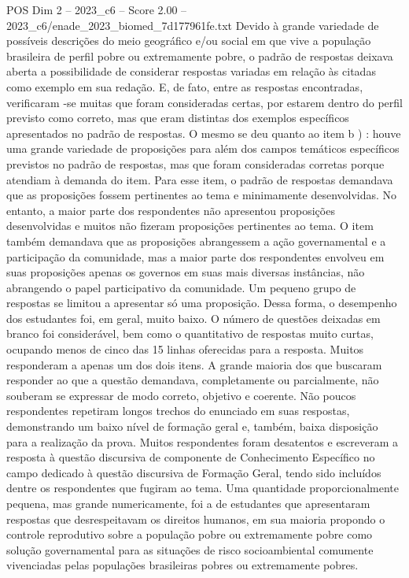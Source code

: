 \begin{textsample}{POS Dim 2 – 2023\_c6 – Score 2.00 – 2023\_c6/enade\_2023\_biomed\_7d177961fe.txt}
Devido à grande variedade de possíveis descrições do meio geográfico e/ou social em que vive a população brasileira de perfil pobre ou extremamente pobre, o padrão de respostas deixava aberta a possibilidade de considerar respostas variadas em relação às citadas como exemplo em sua redação.
E, de fato, entre as respostas encontradas, verificaram -se muitas que foram consideradas certas, por estarem dentro do perfil previsto como correto, mas que eram distintas dos exemplos específicos apresentados no padrão de respostas.
O mesmo se deu quanto ao item b ) : houve uma grande variedade de proposições para além dos campos temáticos específicos previstos no padrão de respostas, mas que foram consideradas corretas porque atendiam à demanda do item.
Para esse item, o padrão de respostas demandava que as proposições fossem pertinentes ao tema e minimamente desenvolvidas.
No entanto, a maior parte dos respondentes não apresentou proposições desenvolvidas e muitos não fizeram proposições pertinentes ao tema.
O item também demandava que as proposições abrangessem a ação governamental e a participação da comunidade, mas a maior parte dos respondentes envolveu em suas proposições apenas os governos em suas mais diversas instâncias, não abrangendo o papel participativo da comunidade.
Um pequeno grupo de respostas se limitou a apresentar só uma proposição.
Dessa forma, o desempenho dos estudantes foi, em geral, muito baixo.
O número de questões deixadas em branco foi considerável, bem como o quantitativo de respostas muito curtas, ocupando menos de cinco das 15 linhas oferecidas para a resposta.
Muitos responderam a apenas um dos dois itens.
A grande maioria dos que buscaram responder ao que a questão demandava, completamente ou parcialmente, não souberam se expressar de modo correto, objetivo e coerente.
Não poucos respondentes repetiram longos trechos do enunciado em suas respostas, demonstrando um baixo nível de formação geral e, também, baixa disposição para a realização da prova.
Muitos respondentes foram desatentos e escreveram a resposta à questão discursiva de componente de Conhecimento Específico no campo dedicado à questão discursiva de Formação Geral, tendo sido incluídos dentre os respondentes que fugiram ao tema.
Uma quantidade proporcionalmente pequena, mas grande numericamente, foi a de estudantes que apresentaram respostas que desrespeitavam os direitos humanos, em sua maioria propondo o controle reprodutivo sobre a população pobre ou extremamente pobre como solução governamental para as situações de risco socioambiental comumente vivenciadas pelas populações brasileiras pobres ou extremamente pobres.

\end{textsample}
